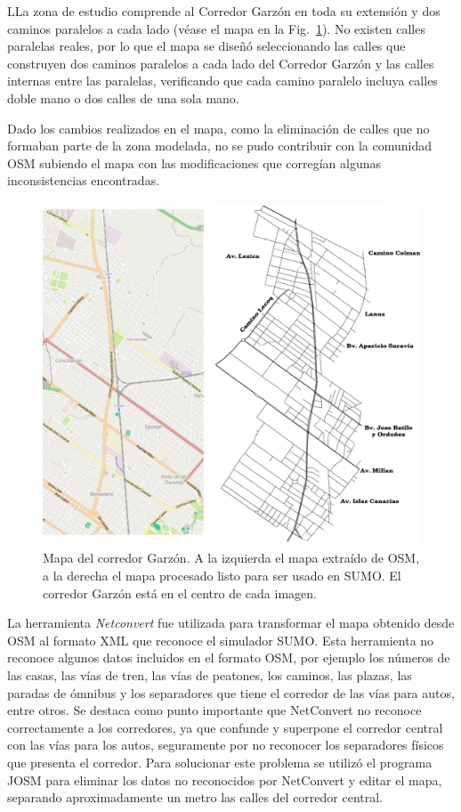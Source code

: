 LLa zona de estudio comprende al Corredor Garzón en toda su extensión y dos caminos paralelos a cada lado (véase el mapa en la Fig.~\ref{fig:mapa_osm_sumo}). No existen calles paralelas reales, por lo que el mapa se diseñó seleccionando las calles que construyen dos caminos paralelos a cada lado del Corredor Garzón y las calles internas entre las paralelas, verificando que cada camino paralelo incluya calles doble mano o dos calles de una sola mano.

Dado los cambios realizados en el mapa, como la eliminación de calles que no formaban parte de la zona modelada, no se pudo contribuir con la comunidad OSM subiendo el mapa con las modificaciones que corregían algunas inconsistencias encontradas.

\begin{figure}[H]
	\centering
	\includegraphics[width=0.9\linewidth]{Figures/mapa_osm_sumo}
	\caption[Mapa del corredor Garzón]{Mapa del corredor Garzón. A la izquierda el mapa extraído de OSM, a la derecha el mapa procesado listo para ser usado en SUMO. El corredor Garzón está en el centro de cada imagen.}
	\label{fig:mapa_osm_sumo}
\end{figure}

La herramienta \emph{Netconvert} fue utilizada para transformar el mapa obtenido desde OSM al formato XML que reconoce el simulador SUMO. Esta herramienta no reconoce algunos datos incluidos en el formato OSM, por ejemplo los números de las casas, las vías de tren, las vías de peatones, los caminos, las plazas, las paradas de ómnibus y los separadores que tiene el corredor de las vías para autos, entre otros. Se destaca como punto importante que NetConvert no reconoce correctamente a los corredores, ya que confunde y superpone el corredor central con las vías para los autos, seguramente por no reconocer los separadores físicos que presenta el corredor. Para solucionar este problema se utilizó el programa JOSM para eliminar los datos no reconocidos por NetConvert y editar el mapa, separando aproximadamente un metro las calles del corredor central.

